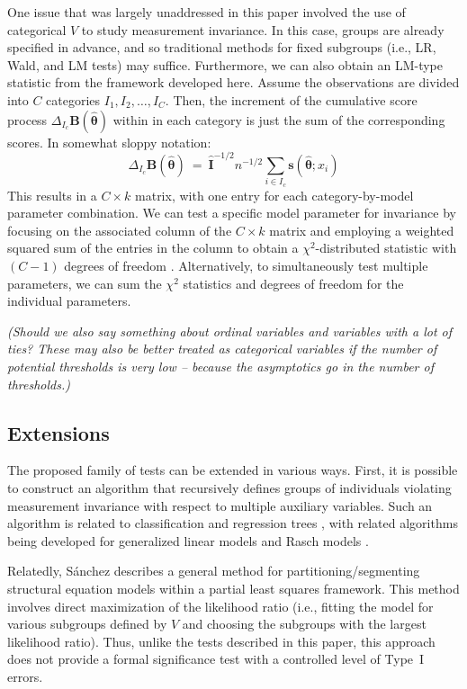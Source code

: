 \documentclass[man]{apa}
\newcommand{\readme}[1]{\emph{\marginpar{README} (#1)}}
\begin{document}
One issue that was largely unaddressed in this paper involved the use
of categorical $V$ to study measurement invariance.  In this case,
groups are 
already specified in advance, and so traditional methods for fixed
subgroups (i.e., LR, Wald, and LM tests) may suffice.
Furthermore, we can also obtain an LM-type statistic from the
framework developed here. Assume the observations are divided into
$C$ categories $I_1, I_2, \ldots, I_C$. Then, the increment of
the cumulative score process $\Delta_{I_c} {\bm B}(\hat {\bm \theta})$
within in each category is just the sum of the corresponding scores.
In somewhat sloppy notation:
\begin{equation}
    \label{eq:catsum}
    \Delta_{I_c} {\bm B}(\hat {\bm \theta}) ~=~ \hat {\bm I}^{-1/2} n^{-1/2}
    \sum_{i \in I_c} {\bm s}(\hat {\bm \theta}; x_i)
\end{equation}
This results in a $C \times k$ matrix, with one entry for
each category-by-model parameter combination.  We can test
a specific model parameter for invariance by focusing on the associated
column of the $C \times k$ matrix and employing a weighted squared sum of
the entries in the column to obtain a $\chi^2$-distributed statistic with
$(C-1)$ degrees of freedom \cite{HjoKon02}.
Alternatively, to simultaneously test multiple parameters, we can sum
the $\chi^2$ statistics and degrees of freedom for the individual
parameters.

\readme{Should we also say something about ordinal variables and
variables with a lot of ties? These may also be better treated as categorical
variables if the number of potential thresholds is very low -- because
the asymptotics go in the number of thresholds.}

\subsection{Extensions}
The proposed family of tests can be extended in various ways.  First,
it is possible to construct an algorithm that recursively defines
groups of individuals violating measurement invariance with respect to
multiple auxiliary variables.  Such an algorithm is related to 
classification and regression trees \cite{BreFri84,MerSha10,StrMal09},
with related algorithms being developed for generalized linear
models \cite{ZeiHot08} and Rasch models \cite{KopZei10}.  

Relatedly,
S\'{a}nchez \citeyear{San09} describes a general
method for partitioning/segmenting structural equation models within a 
partial least squares framework.  This method involves direct maximization of
the likelihood ratio (i.e., fitting the model for various subgroups
defined by 
$V$ and choosing the subgroups with the largest likelihood ratio).
Thus, unlike the tests described in this paper, this approach does not
provide a formal significance test with a controlled level of Type~I errors.
\end{document}
